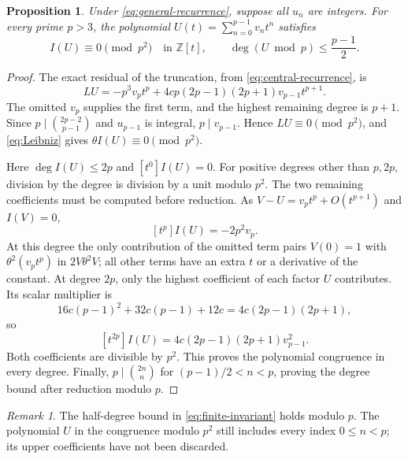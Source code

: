 \documentclass[11pt,a4paper]{article}
\newtheorem{proposition}[theorem]{Proposition}
\theoremstyle{remark}
\newtheorem{remark}[theorem]{Remark}
\newcommand{\Z}{\mathbb Z}\newcommand{\Q}{\mathbb Q}
\begin{document}
\begin{proposition}\label{prop:finite-invariant}
Under \eqref{eq:general-recurrence}, suppose all $u_n$ are integers.
For every prime $p>3$, the polynomial
$U(t)=\sum_{n=0}^{p-1}v_nt^n$ satisfies
\begin{equation}\label{eq:finite-invariant}
 I(U)\equiv0\pmod{p^2}\quad\text{in }\Z[t],
 \qquad \deg(U\bmod p)\le\frac{p-1}{2}.
\end{equation}
\end{proposition}
\begin{proof}
The exact residual of the truncation, from \eqref{eq:central-recurrence}, is
\begin{equation}\label{eq:LU}
 LU=-p^3v_pt^p+4cp(2p-1)(2p+1)v_{p-1}t^{p+1}.
\end{equation}
The omitted $v_p$ supplies the first term, and the highest remaining
degree is $p+1$. Since $p\mid\binom{2p-2}{p-1}$ and $u_{p-1}$ is
integral, $p\mid v_{p-1}$. Hence $LU\equiv0\pmod{p^2}$, and
\eqref{eq:Leibniz} gives $\theta I(U)\equiv0\pmod{p^2}$.

Here $\deg I(U)\le2p$ and $[t^0]I(U)=0$. For positive degrees other
than $p,2p$, division by the degree is division by a unit modulo $p^2$.
The two remaining coefficients must be computed before reduction.
As $V-U=v_pt^p+O(t^{p+1})$ and $I(V)=0$,
\begin{equation}\label{eq:resonance-p}
 [t^p]I(U)=-2p^2v_p.
\end{equation}
At this degree the only contribution of the omitted term pairs
$V(0)=1$ with $\theta^2(v_pt^p)$ in $2V\theta^2V$; all other terms
have an extra $t$ or a derivative of the constant.
At degree $2p$, only the highest coefficient of each factor $U$
contributes. Its scalar multiplier is
\[
 16c(p-1)^2+32c(p-1)+12c=4c(2p-1)(2p+1),
\]
so
\begin{equation}\label{eq:resonance-2p}
 [t^{2p}]I(U)=4c(2p-1)(2p+1)v_{p-1}^2.
\end{equation}
Both coefficients are divisible by $p^2$. This proves the polynomial
congruence in every degree.
Finally, $p\mid\binom{2n}n$ for $(p-1)/2<n<p$, proving the degree bound
after reduction modulo $p$.
\end{proof}

\begin{remark}\label{rem:upper-indices}
The half-degree bound in \eqref{eq:finite-invariant} holds modulo $p$.
The polynomial $U$ in the congruence modulo $p^2$ still includes every
index $0\le n<p$; its upper coefficients have not been discarded.
\end{remark}
\end{document}
